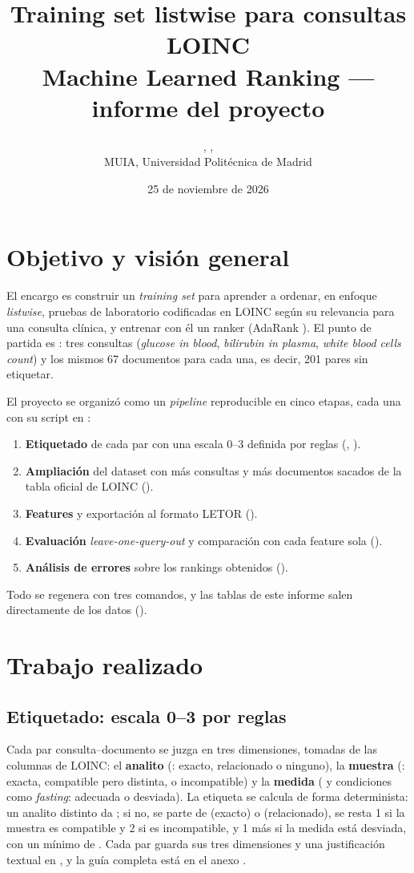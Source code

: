 \documentclass[11pt,a4paper]{article}
\title{\vspace{-1.2cm}Training set listwise para consultas LOINC\\[1pt]
\large Machine Learned Ranking --- informe del proyecto}
\author{\miembroA, \miembroB, \miembroC\\
\small MUIA, Universidad Politécnica de Madrid}
\date{\vspace{-0.4cm}25 de noviembre de 2026}
\begin{document}
\maketitle

\section{Objetivo y visión general}

El encargo es construir un \emph{training set} para aprender a ordenar, en enfoque \emph{listwise}, pruebas de laboratorio
codificadas en LOINC según su relevancia para una consulta clínica, y entrenar con él un ranker (AdaRank \cite{xu2007adarank}).
El punto de partida es : tres consultas (\emph{glucose in blood}, \emph{bilirubin in plasma},
\emph{white blood cells count}) y los mismos 67 documentos para cada una, es decir, 201 pares sin etiquetar.

El proyecto se organizó como un \emph{pipeline} reproducible en cinco etapas, cada una con su script en :
\begin{enumerate}[nosep]
\item \textbf{Etiquetado} de cada par con una escala 0--3 definida por reglas (, ).
\item \textbf{Ampliación} del dataset con más consultas y más documentos sacados de la tabla oficial de LOINC ().
\item \textbf{Features} y exportación al formato LETOR ().
\item \textbf{Evaluación} \emph{leave-one-query-out} y comparación con cada feature sola ().
\item \textbf{Análisis de errores} sobre los rankings obtenidos ().
\end{enumerate}
Todo se regenera con tres comandos, y las tablas de este informe salen directamente de los datos ().

\section{Trabajo realizado}

\subsection{Etiquetado: escala 0--3 por reglas}
Cada par consulta--documento se juzga en tres dimensiones, tomadas de las columnas de LOINC:
el \textbf{analito} (: exacto, relacionado o ninguno), la \textbf{muestra} (: exacta, compatible
pero distinta, o incompatible) y la \textbf{medida} ( y condiciones como \emph{fasting}: adecuada o desviada).
La etiqueta se calcula de forma determinista: un analito distinto da ; si no, se parte de  (exacto) o 
(relacionado), se resta 1 si la muestra es compatible y 2 si es incompatible, y 1 más si la medida está desviada, con un
mínimo de . Cada par guarda sus tres dimensiones y una justificación textual en , y
la guía completa está en el anexo .
\end{document}
